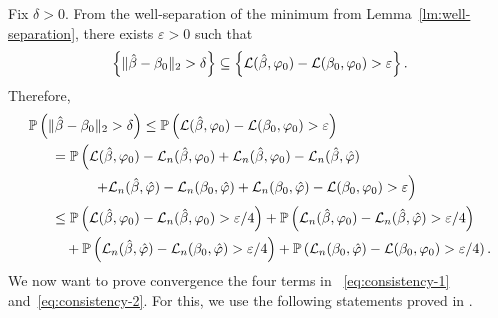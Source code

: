    Fix $\delta > 0$.  From the well-separation of the minimum from Lemma~\ref{lm:well-separation}, there exists $\varepsilon > 0$ such that 
    \begin{align*}
        \left\{\|\hat\beta - \beta_0\|_2 > \delta\right\} \subseteq
        \left\{\mathcal{L}(\hat\beta, \varphi_0)- \mathcal{L}(\beta_0, \varphi_0) > \varepsilon\right\}.
    \end{align*}
    Therefore,
    \begin{align}
        \mathbb{P}&\left(\|\hat\beta - \beta_0\|_2 > \delta \right) \leq 
        \mathbb{P}\left(\mathcal{L}(\hat\beta, \varphi_0)- \mathcal{L}(\beta_0, \varphi_0) > \varepsilon\right) \nonumber\\
        &\quad= 
        \mathbb{P}\left( 
        \mathcal{L}(\hat\beta, \varphi_0)- \mathcal{L}_n(\hat\beta, \varphi_0) + \mathcal{L}_n(\hat\beta, \varphi_0)-
        \mathcal{L}_n(\hat\beta, \hat\varphi)
        \right. \nonumber\\
        &\quad\quad\quad\quad
        \left. 
        + \mathcal{L}_n(\hat\beta, \hat\varphi)
        - \mathcal{L}_n(\beta_0, \hat\varphi)
        + \mathcal{L}_n(\beta_0, \hat\varphi)
        -
        \mathcal{L}(\beta_0, \varphi_0) > \varepsilon
        \right) \nonumber\\
        &\quad \leq
        \mathbb{P}\left(
        \mathcal{L}(\hat\beta, \varphi_0)- \mathcal{L}_n(\hat\beta, \varphi_0) > \varepsilon/4
        \right)
        + \mathbb{P}\left(
        \mathcal{L}_n(\hat\beta, \varphi_0)-
        \mathcal{L}_n(\hat\beta, \hat\varphi) > \varepsilon/4
        \right) \label{eq:consistency-1}\\
        &\quad\quad +
        \mathbb{P}\left(
        \mathcal{L}_n(\hat\beta, \hat\varphi)
        - \mathcal{L}_n(\beta_0, \hat\varphi) > \varepsilon / 4
        \right)
        + \mathbb{P}\left(
        \mathcal{L}_n(\beta_0, \hat\varphi)
        -
        \mathcal{L}(\beta_0, \varphi_0)>\varepsilon/4
        \right) \label{eq:consistency-2}.
    \end{align}
    We now want to prove convergence the four terms in ~\eqref{eq:consistency-1} and~\eqref{eq:consistency-2}. For this, we use the following statements proved in .

